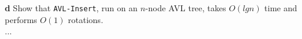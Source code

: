 \documentclass[11pt,english]{article}
\begin{document}
\noindent \large{\textbf{d} \mdseries Show that \texttt{AVL-Insert}, run on an
$n$-node AVL tree, takes $O(lg n)$ time and performs $O(1)$ rotations.}
\\
...








\end{document}
